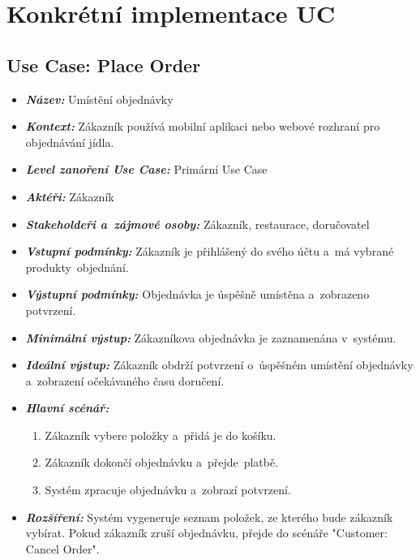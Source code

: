 \section{Konkrétní implementace UC}
\raggedright
\sloppy
    \subsection{Use Case: Place Order}

	\begin{itemize}[itemsep=0pt]
        \item \textbf{\textit{Název:}} Umístění objednávky
        \item \textbf{\textit{Kontext:}} Zákazník používá mobilní aplikaci nebo webové rozhraní pro objednávání jídla.
        \item \textbf{\textit{Level zanoření Use Case:}} Primární Use Case
    	\item \textbf{\textit{Aktéři:}} Zákazník
        \item \textbf{\textit{Stakeholdeři a~zájmové osoby:}} Zákazník, restaurace, doručovatel
        \item \textbf{\textit{Vstupní podmínky:}} Zákazník je přihlášený do svého účtu a~má vybrané produkty~objednání.
        \item \textbf{\textit{Výstupní podmínky:}} Objednávka je úspěšně umístěna a~zobrazeno potvrzení.
        \item \textbf{\textit{Minimální výstup:}} Zákazníkova objednávka je zaznamenána v~systému.
        \item \textbf{\textit{Ideální výstup:}} Zákazník obdrží potvrzení o~úspěšném umístění objednávky a~zobrazení očekávaného času doručení.
        \item \textbf{\textit{Hlavní scénář:}}
			\begin{enumerate}[topsep=0pt]
            	\item Zákazník vybere položky a~přidá je do košíku.
            	\item Zákazník dokončí objednávku a~přejde~platbě.
            	\item Systém zpracuje objednávku a~zobrazí potvrzení.
			\end{enumerate}
        \item \textbf{\textit{Rozšíření:}} {\color{red} Systém vygeneruje seznam položek, ze kterého bude zákazník vybírat.} Pokud zákazník zruší objednávku, přejde do scénáře "Customer: Cancel Order".

	\end{itemize}

